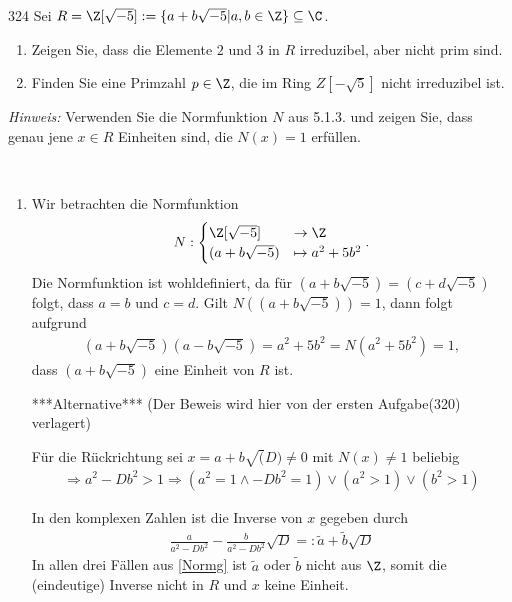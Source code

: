 \begin{algebraUE}{324}
Sei $R = \Z[\sqrt{-5}] := \{a + b\sqrt{-5} | a,b \in \Z\} \subseteq \C$.
\begin{enumerate}
  \item Zeigen Sie, dass die Elemente $2$ und $3$ in $R$ irreduzibel, aber nicht prim
  sind.
  \item Finden Sie eine Primzahl $p \in \Z$, die im Ring $Z[-\sqrt{5}]$ nicht irreduzibel ist.
\end{enumerate}
\textit{Hinweis:} Verwenden Sie die Normfunktion $N$ aus 5.1.3. und zeigen Sie,
dass genau jene $x \in R$ Einheiten sind, die $N(x) = 1$ erfüllen.
\end{algebraUE}
\begin{solution}
\leavevmode \\
\begin{enumerate}
  \item Wir betrachten die Normfunktion
  \begin{align*}
    N: \begin{cases}
      \Z[\sqrt{-5}] &\to \Z \\
      (a + b\sqrt{-5}) &\mapsto a^2 + 5b^2
    \end{cases}.
  \end{align*}
  Die Normfunktion ist wohldefiniert, da für $(a + b\sqrt{-5}) = (c + d\sqrt{-5})$
  folgt, dass $a = b$ und $c = d$.
  Gilt $N((a + b\sqrt{-5}) ) = 1$, dann folgt aufgrund
  \begin{align*}
    (a + b\sqrt{-5})(a - b\sqrt{-5}) = a^2 + 5b^2 = N(a^2 + 5b^2) = 1,
  \end{align*}
  dass $(a + b\sqrt{-5})$ eine Einheit von $R$ ist.

  ***Alternative*** (Der Beweis wird hier von der ersten Aufgabe(320) verlagert)

  Für die Rückrichtung sei $x = a + b\sqrt(D) \neq 0$ mit $N(x) \neq 1$ beliebig
  \begin{align}\label{Normg}
    \Rightarrow a^2 - D b^2 > 1 \Rightarrow (a^2=1 \land -Db^2 = 1) \lor (a^2 > 1) \lor (b^2 > 1)
  \end{align}

  In den komplexen Zahlen ist die Inverse von $x$ gegeben durch
  \begin{align*}
    \frac{a}{a^2 - Db^2} - \frac{b}{a^2-Db^2}\sqrt{D} =: \tilde{a} + \tilde{b} \sqrt{D}
  \end{align*}
  In allen drei Fällen aus \eqref{Normg} ist $\tilde{a}$ oder $\tilde{b}$ nicht aus $\Z$, somit die (eindeutige) Inverse nicht in $R$ und $x$ keine Einheit.


\end{enumerate}
\end{solution}

